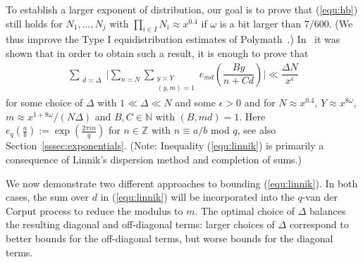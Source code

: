 \documentclass{amsart}
\numberwithin{equation}{section}
\begin{document}
\vspace{3mm} To establish a larger exponent of distribution, our goal is  to prove that (\ref{equ:hb}) still holds for $N_1, \dots, N_j$ with  $\prod_{i \in I} N_i \approx x^{0.4}$ if $\omega$ is a bit larger than $7/600$. (We thus improve the Type I equidistribution estimates of Polymath~\cite{Polymath:2014:EDZ}.)  
In~\cite{Polymath:2014:EDZ} it was shown that in order to obtain such a result, it is  enough to prove that
\begin{align} \label{equ:linnik}
\sum_{\substack{d \asymp \Delta}} \Bigg| \sum_{n \asymp N} \sum_{\substack{y \asymp Y \\ (y,m)=1}} e_{md}\left(\dfrac{By}{n+Cd} \right) \Bigg| \ll \dfrac{\Delta N}{x^\epsilon}
\end{align} 
for some choice of $\Delta$ with $1 \ll \Delta \ll N$ and some $\epsilon>0$   and for $ N \approx x^{0.4}$, $Y \approx x^{8\omega}$, $m \approx x^{1+8\omega}/(N\Delta)$ and $B, C \in \mathbb{N}$ with $(B,md)=1$. Here $e_{q}(\frac{a}{b}):= \exp(\frac{2\pi i n}{q})$ for $n \in \mathbb{Z}$  with $n \equiv a/b$ mod $q$, see also  Section~\ref{sssec:exponentials}. (Note: Inequality (\ref{equ:linnik}) is primarily a consequence of Linnik's dispersion method and completion of sums.) \vspace{3mm}

We now demonstrate two different approaches to  bounding (\ref{equ:linnik}). In both cases, the sum over $d$ in (\ref{equ:linnik}) will be incorporated into the $q$-van der Corput process to reduce the modulus to $m$.  The optimal choice of $\Delta$ balances the resulting diagonal and off-diagonal terms: larger choices of $\Delta$ correspond to better bounds for the off-diagonal terms, but worse bounds for the diagonal terms. 
\end{document}
